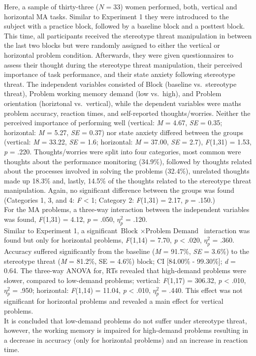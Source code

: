 \documentclass[
  stu,floatsintext]{apa7}
\begin{document}
Here, a sample of thirty-three (\(N = 33\)) women performed, both, vertical and horizontal MA tasks.
Similar to Experiment 1 they were introduced to the subject with a practice block, followed by a baseline block and a posttest block.
This time, all participants received the stereotype threat manipulation in between the last two blocks but were randomly assigned to either the vertical or horizontal problem condition.
Afterwards, they were given questionnaires to assess their thought during the stereotype threat manipulation, their perceived importance of task performance, and their state anxiety following stereotype threat.
The independent variables consisted of Block (baseline vs.~stereotype threat), Problem working memory demand (low vs.~high), and Problem orientation (horiztonal vs.~vertical), while the dependent variables were maths problem accuracy, reaction times, and self-reported thoughts/worries.
Neither the perceived importance of performing well (vertical: \emph{M} = 4.67, \emph{SE} = 0.35; horizontal: \emph{M} = 5.27, \emph{SE} = 0.37) nor state anxiety differed between the groups (vertical: \emph{M} = 33.22, \emph{SE} = 1.6; horizontal: \emph{M} = 37.00, \emph{SE} = 2.7), \emph{F}(1,31) = 1.53, \emph{p} = .220.
Thoughts/worries were split into four categories, most common were thoughts about the performance monitoring (34.9\%), followed by thoughts related about the processes involved in solving the problems (32.4\%), unrelated thoughts made up 18.3\% and, lastly, 14.5\% of the thoughts related to the stereotype threat manipulation.
Again, no significant difference between the groups was found (Categories 1, 3, and 4: \emph{F} \textless{} 1; Category 2: \emph{F}(1,31) = 2.17, \emph{p} = .150.)\\
For the MA problems, a three-way interaction between the independent variables was found, \emph{F}(1,31) = 4.12, \emph{p} = .050, \(\eta^{2}_{p}\) = .120.\\
Similar to Experiment 1, a significant \(\text{Block } \times \text{Problem Demand }\) interaction was found but only for horizontal problems, \emph{F}(1,14) = 7.70, \emph{p} \textless{} .020, \(\eta^{2}_{p}\) = .360.
Accuracy suffered significantly from the baseline (\emph{M} = 91.7\%, \emph{SE} = 3.6\%) to the stereotype threat (\emph{M} = 81.2\%, SE = 4.6\%) block; CI {[}84.00\% - 99.30\%{]}; \emph{d} = 0.64.
The three-way ANOVA for, RTs revealed that high-demand problems were slower, compared to low-demand problems; vertical: \emph{F}(1,17) = 306.32, \emph{p} \textless{} .010, \(\eta^{2}_{p}\) = .950; horizontal: \emph{F}(1,14) = 11.04, \emph{p} \textless{} .010, \(\eta^{2}_{p}\) = .440.
This effect was not significant for horizontal problems and revealed a main effect for vertical problems.\\
It is concluded that low-demand problems do not suffer under stereotype threat, however, the working memory is impaired for high-demand problems resulting in a decrease in accuracy (only for horizontal problems) and an increase in reaction time.
\end{document}
